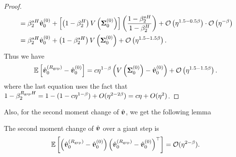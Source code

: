 \begin{proof}
\begin{align*}
         &= \beta_2^{sH} \hat{{\bm{v}}}_0^{(0)} + \left[\left(1 - \beta_2^H\right) V\left({\bm{\Sigma}}_0^{(0)}\right) \right]\left(\frac{1-\beta_2^{sH}}{1-\beta_2^{H}}\right) + \mathcal{O}\left(\eta^{1.5-0.5\beta}\right) \cdot \mathcal{O}\left(\eta^{-\beta}\right) \\
         &= \beta_2^{sH} \hat{{\bm{v}}}_0^{(0)} + \left(1 - \beta_2^{sH}\right) V\left({\bm{\Sigma}}_0^{(0)}\right) + \mathcal{O}\left(\eta^{1.5-1.5\beta}\right).
    \end{align*}
    Thus we have
    \begin{align*}
        \mathbb{E}\left[\hat{{\bm{v}}}_0^{(R_{\mathrm{grp}})} -\hat{{\bm{v}}}_0^{(0)}\right] = c \eta^{1-\beta} \left(V\left({\bm{\Sigma}}_0^{(0)}\right) - \hat{{\bm{v}}}_0^{(0)}\right) + \mathcal{O}\left(\eta^{1.5-1.5\beta}\right).
    \end{align*}
    where the last equation uses the fact that $1-\beta_2^{R_{\mathrm{grp}} H} = 1 - (1 -c\eta^{1-\beta}) +O(\eta^{2-2\beta})=c\eta + O(\eta^2)$. 
\end{proof}
Also, for the second moment change of $\hat{{\bm{v}}}$, we get the following lemma
\begin{lemma}\label{lmm:2nd-moment-v}
    The second moment change of $\hat{{\bm{v}}}$ over a giant step is
    \begin{align*}
        \mathbb{E}\left[\left(\hat{{\bm{v}}}_0^{(R_{\mathrm{grp}})} - \hat{{\bm{v}}}_0^{(0)}\right)\left(\hat{{\bm{v}}}_0^{(R_{\mathrm{grp}})} - \hat{{\bm{v}}}_0^{(0)}\right)^{\top}\right] = \mathcal{O}(\eta^{2-\beta}).
    \end{align*}
\end{lemma}
